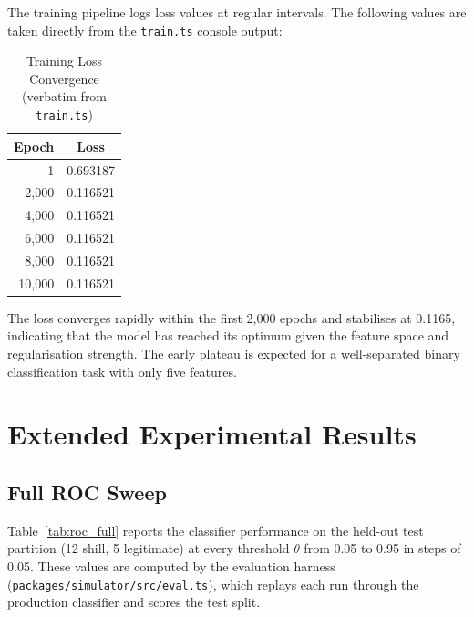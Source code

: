 \documentclass[11pt]{article}
\begin{document}
The training pipeline logs loss values at regular intervals. The following
values are taken directly from the \texttt{train.ts} console output:

\begin{table}[ht]
\centering
\caption{Training Loss Convergence (verbatim from \texttt{train.ts})}
\label{tab:convergence}
\begin{tabular}{rc}
\toprule
\textbf{Epoch} & \textbf{Loss} \\
\midrule
1 & 0.693187 \\
2,000 & 0.116521 \\
4,000 & 0.116521 \\
6,000 & 0.116521 \\
8,000 & 0.116521 \\
10,000 & 0.116521 \\
\bottomrule
\end{tabular}
\end{table}

The loss converges rapidly within the first 2{,}000 epochs and stabilises
at 0.1165, indicating that the model has reached its optimum given the
feature space and regularisation strength. The early plateau is expected
for a well-separated binary classification task with only five features.

\section{Extended Experimental Results}
\label{sec:results}

\subsection{Full ROC Sweep}

Table~\ref{tab:roc_full} reports the classifier performance on the
held-out test partition (12 shill, 5 legitimate) at every threshold
$\theta$ from 0.05 to 0.95 in steps of 0.05. These values are computed by
the evaluation harness (\texttt{packages/simulator/src/eval.ts}), which
replays each run through the production classifier and scores the test
split.
\end{document}
